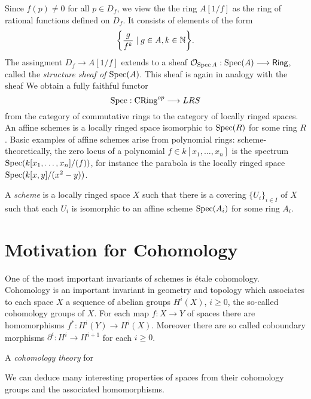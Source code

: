 Since $f(p) \neq 0$ for all $p \in D_f$, we view the the ring $A[1/f]$ as the ring of rational functions defined on $D_f$. It consists of elements of the form 
\[
  \biggl\{ \frac{g}{f^k} \mid g \in A, k \in \mathbb{N} \biggr\}.
\]
The assingment $D_f \to A[1/f]$ extends to a sheaf $\mathcal{O}_{\operatorname{Spec}{A}}: \operatorname{Spec}(A) \longrightarrow \mathsf{Ring}$, called the \textit{structure sheaf of $\operatorname{Spec}(A)$}. This sheaf is again in analogy with the sheaf We obtain a fully faithful functor
\[
\operatorname{Spec} : \text{CRing}^{op} \longrightarrow LRS
\]
from the category of commutative rings to the category of locally ringed spaces. An affine schemes is a locally ringed space isomorphic to $\operatorname{Spec}(R)$ for some ring $R$. Basic examples of affine schemes arise from polynomial rings: scheme-theoretically, the zero locus of a polynomial $f \in k[x_1, \dots, x_n]$ is the spectrum $\operatorname{Spec}(k[x_1, \dots, x_n]/(f))$, for instance the parabola is the locally ringed space $\operatorname{Spec}(k[x,y]/(x^2-y))$.

\begin{definition}
  A \textit{scheme} is a locally ringed space $X$ such that there is a covering $\{U_i\}_{i \in I}$ of $X$ such that each $U_i$ is isomorphic to an affine scheme $\operatorname{Spec}(A_i)$ for some ring $A_i$.
\end{definition}

\section{Motivation for Cohomology}
One of the most important invariants of schemes is \'etale cohomology.  Cohomology is an important invariant in geometry and topology which associates to each space $X$ a sequence of abelian groups $H^i(X)$, $i \ge 0$, the so-called cohomology groups of $X$. For each map $f: X \to Y$ of spaces there are homomorphisms $f^*: H^i(Y) \to H^i(X)$. Moreover there are so called coboundary morphisms $\partial^i : H^i \to H^{i+1}$ for each $i \ge 0$.
\begin{definition}
    A \textit{cohomology theory} for
\end{definition}
We can deduce many interesting properties of spaces from their cohomology groups and the associated homomorphisms.

